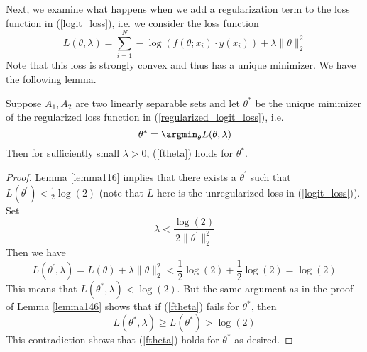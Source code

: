 Next, we examine what happens when we add a regularization term to the loss function in (\ref{logit_loss}), i.e. we consider
the loss function
\begin{equation}\label{regularized_logit_loss}
 L(\theta,\lambda) = \displaystyle\sum_{i = 1}^N -\log\left(f(\theta;x_i)\cdot y(x_i)\right) + \lambda \|\theta\|_2^2
\end{equation}
Note that this loss is strongly convex and thus has a unique minimizer. We have the following lemma.
\begin{lemma}
 Suppose $A_1,A_2$ are two linearly separable sets and let $\theta^*$ be the unique minimizer of the 
 regularized loss function in (\ref{regularized_logit_loss}), i.e.
 \begin{equation}
  \theta^* = \argmin_\theta L(\theta, \lambda)
 \end{equation}
 Then for sufficiently small $\lambda > 0$, (\ref{ftheta}) holds for $\theta^*$.
\end{lemma}
\begin{proof}
 Lemma \ref{lemma116} implies that there exists a $\theta^\prime$ such that $L(\theta^\prime) < \frac{1}{2}\log(2)$ (note
 that $L$ here is the unregularized loss in (\ref{logit_loss})). Set 
 $$\lambda < \frac{\log(2)}{2\|\theta^\prime\|_2^2}$$
 Then we have
 \begin{equation}
  L(\theta^\prime, \lambda) = L(\theta) + \lambda \|\theta\|_2^2 < \frac{1}{2}\log(2) + \frac{1}{2}\log(2) = \log(2)
 \end{equation}
 This means that $L(\theta^*,\lambda) < \log(2)$. But the same argument as in the proof of Lemma \ref{lemma146} shows that
 if (\ref{ftheta}) fails for $\theta^*$, then
 $$L(\theta^*, \lambda) \geq L(\theta^*) > \log(2)$$
 This contradiction shows that (\ref{ftheta}) holds for $\theta^*$ as desired.

\end{proof}


